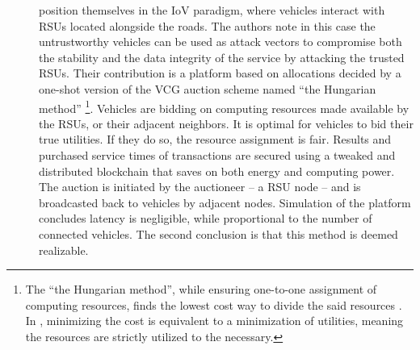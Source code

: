 \documentclass[11pt]{sdm}
\begin{document}
\begin{description}
	\item[\citet{lee_trustful_2020}] position themselves in the \gls{IoV} paradigm, where vehicles interact with \glspl{RSU} located alongside the roads. The authors note in this case the untrustworthy vehicles can be used as attack vectors to compromise both the stability and the data integrity of the service by attacking the trusted \glspl{RSU}. Their contribution is a platform based on allocations decided by a one-shot version of the \gls{VCG} auction scheme named ``the Hungarian method'' \footnote{The ``the Hungarian method'', while ensuring one-to-one assignment of computing resources, finds the lowest cost way to divide the said resources \cite{wikipedia_hungarian_2021}. In \cite{lee_trustful_2020}, minimizing the cost is equivalent to a minimization of utilities, meaning the resources are strictly utilized to the necessary.}. Vehicles are bidding on computing resources made available by the \glspl{RSU}, or their adjacent neighbors. It is optimal for vehicles to bid their true utilities. If they do so, the resource assignment is fair. Results and purchased service times of transactions are secured using a tweaked and distributed blockchain that saves on both energy and computing power. The auction is initiated by the auctioneer -- a \gls{RSU} node -- and is broadcasted back to vehicles by adjacent nodes. Simulation of the platform concludes latency is negligible, while proportional to the number of connected vehicles. The second conclusion is that this method is deemed realizable.
	

\end{description}
\end{document}
